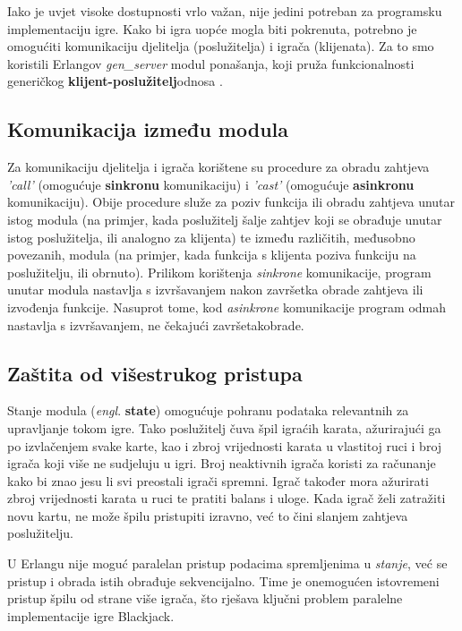 \documentclass[conference]{IEEEtran}
\begin{document}
Iako je uvjet visoke dostupnosti vrlo važan, nije jedini potreban za programsku implementaciju igre. Kako bi igra uopće mogla biti pokrenuta, potrebno je omogućiti komunikaciju djelitelja (poslužitelja) i igrača (klijenata). Za to smo koristili Erlangov \textit{gen\_server} modul ponašanja, koji pruža funkcionalnosti generičkog \textbf{klijent-poslužitelj}\break odnosa \cite{genserver}.


\subsection{Komunikacija između modula}

Za komunikaciju djelitelja i igrača korištene su procedure za obradu zahtjeva \textit{'call'} (omogućuje \textbf{sinkronu} komunikaciju) i \textit{'cast'} (omogućuje \textbf{asinkronu} komunikaciju). Obije procedure služe za poziv funkcija ili obradu zahtjeva unutar istog modula (na primjer, kada poslužitelj šalje zahtjev koji se obrađuje unutar istog poslužitelja, ili analogno za klijenta) te između različitih, međusobno povezanih, modula (na primjer, kada funkcija s klijenta poziva funkciju na poslužitelju, ili obrnuto). Prilikom korištenja \textit{sinkrone} komunikacije, program unutar modula nastavlja s izvršavanjem nakon završetka obrade zahtjeva ili izvođenja funkcije. Nasuprot tome, kod \textit{asinkrone} komunikacije program odmah nastavlja s izvršavanjem, ne čekajući završetak\break obrade.

\subsection{Zaštita od višestrukog pristupa}

Stanje modula (\textit{engl}. \textbf{state}) omogućuje pohranu podataka relevantnih za upravljanje tokom igre. Tako poslužitelj čuva špil igraćih karata, ažurirajući ga po izvlačenjem svake karte, kao i zbroj vrijednosti karata u vlastitoj ruci i broj igrača koji više ne sudjeluju u igri. Broj neaktivnih igrača koristi za računanje kako bi znao jesu li svi preostali igrači spremni. Igrač također mora ažurirati zbroj vrijednosti karata u ruci te pratiti balans i uloge. Kada igrač želi zatražiti novu kartu, ne može špilu pristupiti izravno, već to čini slanjem zahtjeva poslužitelju.

U Erlangu nije moguć paralelan pristup podacima spremljenima u \textit{stanje}, već se pristup i obrada istih obrađuje sekvencijalno. Time je onemogućen istovremeni pristup špilu od strane više igrača, što rješava ključni problem paralelne implementacije igre Blackjack.
\end{document}
